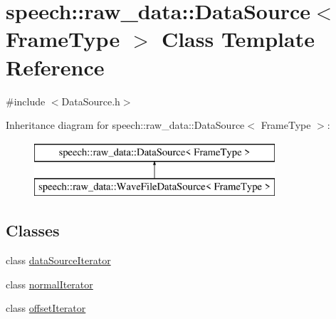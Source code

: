 \hypertarget{classspeech_1_1raw__data_1_1DataSource}{\section{speech\+:\+:raw\+\_\+data\+:\+:Data\+Source$<$ Frame\+Type $>$ Class Template Reference}
\label{classspeech_1_1raw__data_1_1DataSource}
}


{\ttfamily \#include $<$Data\+Source.\+h$>$}

Inheritance diagram for speech\+:\+:raw\+\_\+data\+:\+:Data\+Source$<$ Frame\+Type $>$\+:\begin{figure}[H]
\begin{center}
\leavevmode
\includegraphics[height=2.000000cm]{classspeech_1_1raw__data_1_1DataSource}
\end{center}
\end{figure}
\subsection*{Classes}
\begin{DoxyCompactItemize}
\item 
class \hyperlink{classspeech_1_1raw__data_1_1DataSource_1_1dataSourceIterator}{data\+Source\+Iterator}
\item 
class \hyperlink{classspeech_1_1raw__data_1_1DataSource_1_1normalIterator}{normal\+Iterator}
\item 
class \hyperlink{classspeech_1_1raw__data_1_1DataSource_1_1offsetIterator}{offset\+Iterator}
\end{DoxyCompactItemize}
